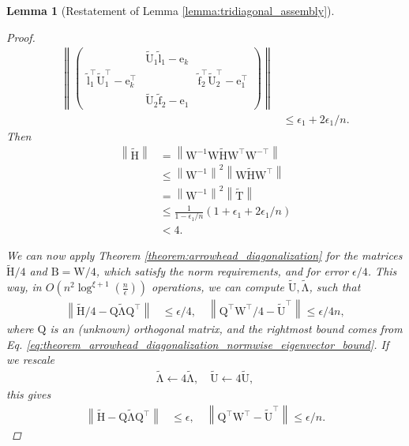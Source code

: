 \documentclass{article}
\newcommand{\lnorm}{\left\|}
\newcommand{\rnorm}{\right\|}
\newcommand{\lpar}{\left(}
\newcommand{\rpar}{\right)}
\newtheorem{lemma}{Lemma}[section]
\newcommand\vece{\boldsymbol{\mathrm{e}}}
\newcommand\vecftilde{\widetilde{\boldsymbol{\mathrm{f}}}}
\newcommand\vecltilde{\widetilde{\boldsymbol{\mathrm{l}}}}
\newcommand\matB{\boldsymbol{\mathrm{B}}}
\newcommand\matQ{\boldsymbol{\mathrm{Q}}}
\newcommand\matW{\boldsymbol{\mathrm{W}}}
\newcommand\matHtilde{\widetilde{\boldsymbol{\mathrm{H}}}}
\newcommand\matTtilde{\widetilde{\boldsymbol{\mathrm{T}}}}
\newcommand\matUtilde{\widetilde{\boldsymbol{\mathrm{U}}}}
\newcommand\matLambdatilde{\widetilde{\boldsymbol{\mathrm{\Lambda}}}}
\newcommand{\cfmm}{\xi}
\begin{document}
\begin{lemma}[Restatement of Lemma \ref{lemma:tridiagonal_assembly}]
\begin{proof}
\begin{align*}
            \lnorm
            \begin{pmatrix}
                 & \matUtilde_1\vecltilde_1-\vece_k & \\
                \vecltilde_1^\top\matUtilde_1^\top-\vece_k^\top &  & \vecftilde_2^\top\matUtilde_2^\top - \vece_1^\top \\
                 & \matUtilde_2\vecftilde_2 - \vece_1 & 
            \end{pmatrix}
            \rnorm
            \\
            &\leq
            \epsilon_1 + 2\epsilon_1/n.
        \end{align*}
        Then 
        \begin{align*}
            \lnorm \matHtilde \rnorm 
            &= 
            \lnorm \matW^{-1}\matW\matHtilde\matW^\top\matW^{-\top}\rnorm
            \\
            &\leq
            \lnorm \matW^{-1}\rnorm^2
            \lnorm \matW\matHtilde\matW^\top \rnorm
            \\
            &= 
            \lnorm \matW^{-1}\rnorm^2
            \lnorm \matTtilde \rnorm
            \\
            &\leq 
                \frac{1}{1-\epsilon_1/n}
                \lpar1+\epsilon_1+2\epsilon_1/n\rpar
                \\
            &<
            4.
        \end{align*}
        
        We can now apply Theorem \ref{theorem:arrowhead_diagonalization} for the matrices $\matHtilde/4$ and $\matB=\matW/4$, which satisfy the norm requirements, and for error  $\epsilon/4$. This way, in $O\lpar n^2\log^{\cfmm+1}(\tfrac{n}{\epsilon})\rpar$ operations, we can compute $\matUtilde,\matLambdatilde$, such that
        \begin{align*}
            \lnorm \matHtilde/4-\matQ\matLambdatilde\matQ^\top \rnorm &\leq \epsilon/4,
            \quad
            \lnorm \matQ^\top\matW^\top/4 - \matUtilde^\top\rnorm \leq \epsilon/4n,
        \end{align*}
        where $\matQ$ is an (unknown) orthogonal matrix, and the rightmost bound comes from Eq. \eqref{eq:theorem_arrowhead_diagonalization_normwise_eigenvector_bound}. If we rescale
        \begin{align*}
            \matLambdatilde \leftarrow 4\matLambdatilde, \quad \matUtilde\leftarrow 4 \matUtilde,
        \end{align*}
        this gives
        \begin{align*}
            \lnorm \matHtilde-\matQ\matLambdatilde\matQ^\top \rnorm &\leq \epsilon,
            \quad
            \lnorm \matQ^\top\matW^\top - \matUtilde^\top\rnorm \leq \epsilon/n.
        \end{align*}
        

\end{proof}
\end{lemma}
\end{document}
